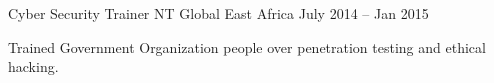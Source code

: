 \begin{cventries}
  \cventry
    {Cyber Security Trainer} %
    {NT Global} %
    {East Africa} %
    {July 2014 – Jan 2015} %
    {
      \begin{cvitems} %
        \item {Trained Government Organization people over penetration testing and ethical hacking.}
      \end{cvitems}
    }

\end{cventries}
